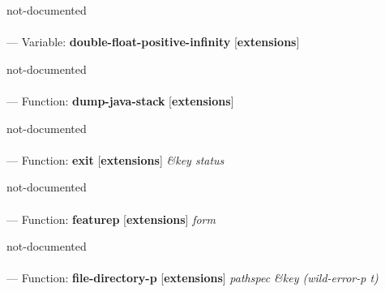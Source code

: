 \begin{adjustwidth}{5em}{5em}
not-documented
\end{adjustwidth}

\paragraph{}
\label{EXTENSIONS:DOUBLE-FLOAT-POSITIVE-INFINITY}
--- Variable: \textbf{double-float-positive-infinity} [\textbf{extensions}] \textit{}

\begin{adjustwidth}{5em}{5em}
not-documented
\end{adjustwidth}

\paragraph{}
\label{EXTENSIONS:DUMP-JAVA-STACK}
--- Function: \textbf{dump-java-stack} [\textbf{extensions}] \textit{}

\begin{adjustwidth}{5em}{5em}
not-documented
\end{adjustwidth}

\paragraph{}
\label{EXTENSIONS:EXIT}
--- Function: \textbf{exit} [\textbf{extensions}] \textit{\&key status}

\begin{adjustwidth}{5em}{5em}
not-documented
\end{adjustwidth}

\paragraph{}
\label{EXTENSIONS:FEATUREP}
--- Function: \textbf{featurep} [\textbf{extensions}] \textit{form}

\begin{adjustwidth}{5em}{5em}
not-documented
\end{adjustwidth}

\paragraph{}
\label{EXTENSIONS:FILE-DIRECTORY-P}
--- Function: \textbf{file-directory-p} [\textbf{extensions}] \textit{pathspec \&key (wild-error-p t)}

